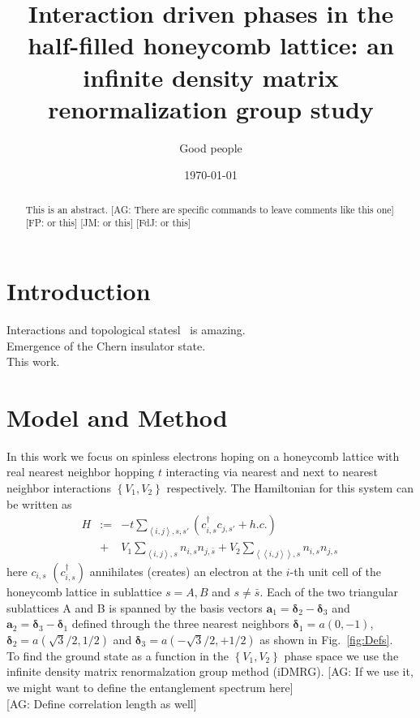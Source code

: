 \documentclass[aps,prx,10pt,twocolumn,floatfix,superscriptaddress,showpacs,numerical,footinbib]{revtex4-1}
\newcommand{\noteAG}[1]{{\color{blue} [AG: #1]}}
\newcommand{\noteFP}[1]{{\color{magenta} [FP: #1]}}
\newcommand{\noteJM}[1]{{\color{red} [JM: #1]}}
\newcommand{\noteFdJ}[1]{{\color{cyan} [FdJ: #1]}}
\newcommand{\bs}[1]{{\boldsymbol{#1}}}
\begin{document}
%
\title{Interaction driven phases in the half-filled honeycomb lattice: an infinite density matrix renormalization group study}
%
\author{Good people}
%
\date{\today}
%
\begin{abstract}
%
This is an abstract. \noteAG{There are specific commands to leave comments like this one}\noteFP{or this}\noteJM{or this}\noteFdJ{or this}
%
\end{abstract}
%
\maketitle
%

\section{Introduction}
%
Interactions and topological statesl~\cite{H88} is amazing.\\
%

%
Emergence of the Chern insulator state.\\
%

%
This work.\\


\section{Model and Method}
%
In this work we focus on spinless electrons hoping on a honeycomb lattice with real nearest neighbor hopping $t$ interacting via nearest and next to nearest neighbor interactions 
$\left\lbrace V_{1},V_{2}\right\rbrace$ respectively. 
%
The Hamiltonian for this system can be written as
\begin{eqnarray}
\nonumber
%
H&:=&-t\sum_{\left\langle i,j\right\rangle ,s,s'}(c^{\dagger}_{i,s}c_{j,s'}+h.c.)\\
%
\;&+&
V_{1}\sum_{\left\langle i,j\right\rangle ,s }n_{i,s}n_{j,\bar{s}}+
%
V_{2}\sum_{\left\langle \left\langle i,j\right\rangle \right\rangle ,s }n_{i,s}n_{j,s}\,
%
\label{eq:H}
%
\end{eqnarray}
%
here $c_{i,s}$ $(c^{\dagger}_{i,s})$  annihilates (creates) an electron at the $i$-th unit cell of the honeycomb lattice
in sublattice $s=A,B$ and $s\neq\bar{s}$. 
%
Each of the two triangular sublattices A and B is spanned by the basis vectors
$\bs{a}_{1}=\bs{\delta}_{2}-\bs{\delta}_{3}$ and 
$\bs{a}_{2}=\bs{\delta}_{3}-\bs{\delta}_{1}$ defined through the three nearest neighbors $\bs{\delta}_{1}=a(0,-1)$,  
$\bs{\delta}_{2}=a(\sqrt{3}/2,1/2)$ and $\bs{\delta}_{3}=a(-\sqrt{3}/2,+1/2)$ as shown in Fig.~\ref{fig:Defs}.\\
%
%
To find the ground state as a function in the $\left\lbrace V_{1},V_{2}\right\rbrace$ phase space
we use the infinite density matrix renormalzation group method (iDMRG). 
%
\noteAG{If we use it, we might want to define the entanglement spectrum here}\\
\noteAG{Define correlation length as well}
%
\end{document}
